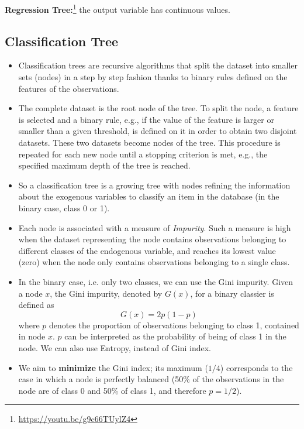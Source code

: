 \textbf{Regression Tree:}\footnote{\url{https://youtu.be/g9c66TUylZ4}} the output variable has continuous values.

\subsection{Classification Tree}

\begin{itemize}
    \item Classification trees are recursive algorithms that split the dataset into smaller sets (nodes) in a step by step fashion thanks to binary rules defined on the features of the observations. 
    \item The complete dataset is the root node of the tree. To split the node, a feature is selected and a binary rule, e.g., if the value of the feature is larger or smaller than a given threshold, is defined on it in order to obtain two disjoint datasets. These two datasets become nodes of the tree. This procedure is repeated for each new node until a stopping criterion is met, e.g., the specified maximum depth of the tree is reached. 
    \item So a classification tree is a growing tree with nodes refining the information about the exogenous variables to classify an item in the database (in the binary case, class 0 or 1). 
    \item Each node is associated with a measure of \textit{Impurity}. Such a measure is high when the dataset representing the node contains observations belonging to different classes of the endogenous variable, and reaches its lowest value (zero) when the node only contains observations belonging to a single class.
    \item In the binary case, i.e. only two classes, we can use the Gini impurity. Given a node $x$, the Gini impurity, denoted by $G(x)$, for a binary classier is defined as
    \begin{equation*}
        G(x) = 2p(1-p)
    \end{equation*}
    where $p$ denotes the proportion of observations belonging to class 1, contained in node $x$. $p$ can be interpreted as the probability of being of class 1 in the node. We can also use Entropy, instead of Gini index.
    \item We aim to \textbf{minimize} the Gini index; its maximum ($1/4$) corresponds to the case in which a node is perfectly balanced (50\% of the observations in the node are of class 0 and 50\% of class 1, and therefore $p=1/2$).

\end{itemize}

